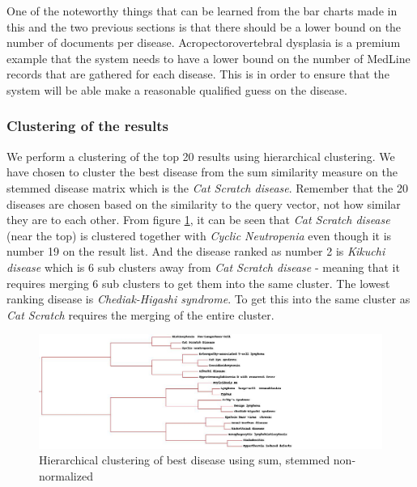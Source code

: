 One of the noteworthy things that can be learned from the bar charts made in this and 
the two previous sections is that there should be a lower bound on the number of documents 
per disease. Acropectorovertebral dysplasia is a premium example that the system needs to 
have a lower bound on the number of MedLine records that are gathered for each disease. 
This is in order to ensure that the system will be able make a reasonable qualified guess 
on the disease.

\subsubsection{Clustering of the results}
We perform a clustering of the top 20 results using hierarchical
clustering. We have chosen to cluster the best disease from the sum 
similarity measure on the stemmed disease matrix which is the \textit{Cat Scratch disease}. Remember
that the 20 diseases are chosen based on the similarity to the query
vector, not how similar they are to each other. From figure
\ref{sum_stem_top20_best_cat_scratch_disease}, it can be seen that \textit{Cat
Scratch disease} (near the top) is clustered together with \textit{Cyclic
Neutropenia} even though it is number 19 on the result list. And the
disease ranked as number 2 is \textit{Kikuchi disease} which is 6
sub clusters away from \textit{Cat Scratch disease} - meaning that it requires
merging 6 sub clusters to get them into the same cluster. The lowest
ranking disease is \textit{Chediak-Higashi syndrome}. To get this into the same
cluster as \textit{Cat Scratch} requires the merging of the entire cluster. 

\begin{figure}[H]
  \begin{center}
    \includegraphics[width=1.3\textwidth]{clusters/sum_stem_top20_best_cat_scratch_disease.jpg}
  \end{center}
  \caption{Hierarchical clustering of best disease using sum, stemmed non-normalized}
  \label{sum_stem_top20_best_cat_scratch_disease}
\end{figure}

